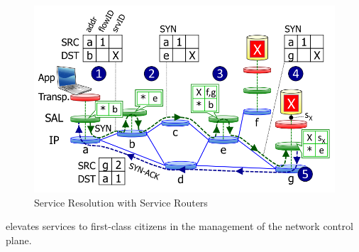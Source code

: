 \begin{figure}
\centering
{}
\includegraphics[scale=0.4]{figures/establishing_connection}
\caption[Service Resolution with Service Routers]{Service Resolution with Service Routers}
\label{fig:sal_position}
\end{figure}

elevates services to first-class citizens in the management of the network control plane.




